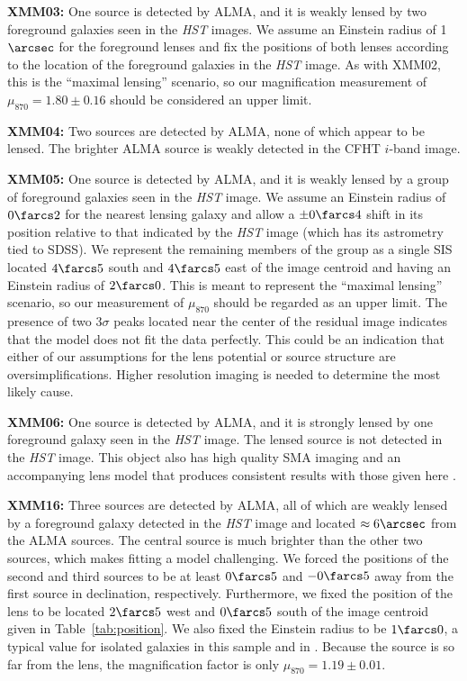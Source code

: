 \documentclass[iop]{emulateapj}
\begin{document}
{\bf XMM03:} One source is detected by ALMA, and it is weakly lensed by two
foreground galaxies seen in the {\it HST} images.  We assume an Einstein radius
of 1$\arcsec$ for the foreground lenses and fix the positions of both lenses
according to the location of the foreground galaxies in the {\it HST} image.
As with XMM02, this is the ``maximal lensing'' scenario, so our magnification
measurement of $\mu_{870} = 1.80 \pm 0.16$ should be considered an upper limit.

{\bf XMM04:} Two sources are detected by ALMA, none of which appear to be
lensed.  The brighter ALMA source is weakly detected in the CFHT $i$-band
image.  

{\bf XMM05:} One source is detected by ALMA, and it is weakly lensed by a group
of foreground galaxies seen in the {\it HST} image.  We assume an Einstein
radius of $0\farcs2$ for the nearest lensing galaxy and allow a $\pm0\farcs4$
shift in its position relative to that indicated by the {\it HST} image (which
has its astrometry tied to SDSS).  We represent the remaining members of the
group as a single SIS located $4\farcs5$ south and $4\farcs5$ east of the image
centroid and having an Einstein radius of $2\farcs0$.  This is meant to
represent the ``maximal lensing'' scenario, so our measurement of $\mu_{870}$
should be regarded as an upper limit.  The presence of two $3\sigma$ peaks
located near the center of the residual image indicates that the model does not
fit the data perfectly.  This could be an indication that either of our
assumptions for the lens potential or source structure are oversimplifications.
Higher resolution imaging is needed to determine the most likely cause.

{\bf XMM06:} One source is detected by ALMA, and it is strongly lensed by one
foreground galaxy seen in the {\it HST} image.  The lensed source is not
detected in the {\it HST} image.  This object also has high quality SMA imaging
and an accompanying lens model that produces consistent results with those
given here \citep{Bussmann:2013lr}.

{\bf XMM16:} Three sources are detected by ALMA, all of which are weakly lensed
by a foreground galaxy detected in the {\it HST} image and located $\approx
6\arcsec$ from the ALMA sources.  The central source is much brighter than the
other two sources, which makes fitting a model challenging.  We forced the
positions of the second and third sources to be at least $0\farcs5$ and
$-0\farcs5$ away from the first source in declination, respectively.
Furthermore, we fixed the position of the lens to be located $2\farcs5$ west
and $0\farcs5$ south of the image centroid given in Table~\ref{tab:position}.
We also fixed the Einstein radius to be $1\farcs0$, a typical value for
isolated galaxies in this sample and in \citet{Bussmann:2013lr}.  Because the
source is so far from the lens, the magnification factor is only $\mu_{870} =
1.19 \pm 0.01$.
\end{document}
